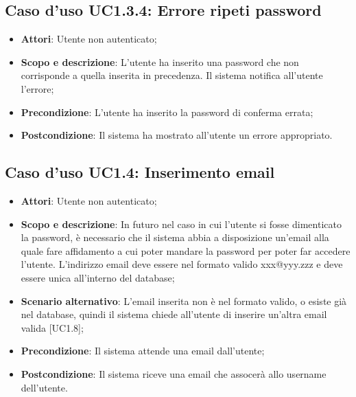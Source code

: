 \documentclass[12pt,a4paper,titlepage]{article}
\begin{document}
	\subsection{Caso d'uso UC1.3.4: Errore ripeti password}
	\label{UC1.3.4}
	\begin{itemize}
		\item \textbf{Attori}: Utente non autenticato;
		\item \textbf{Scopo e descrizione}: L'utente ha inserito una password che non corrisponde a quella inserita in precedenza. Il sistema notifica all'utente l'errore;
		\item \textbf{Precondizione}: L'utente ha inserito la password di conferma errata;
		\item \textbf{Postcondizione}: Il sistema ha mostrato all'utente un errore appropriato.
	\end{itemize}
	\subsection{Caso d'uso UC1.4: Inserimento email}
	\label{UC1.4}
	\begin{itemize}
		\item \textbf{Attori}: Utente non autenticato;
		\item \textbf{Scopo e descrizione}: In futuro nel caso in cui l'utente si fosse dimenticato la password, è necessario che il sistema abbia a disposizione un'email alla quale fare affidamento a cui poter mandare la password per poter far accedere l'utente. L'indirizzo email deve essere nel formato valido xxx@yyy.zzz e deve essere unica all'interno del database;
		\item \textbf{Scenario alternativo}: L'email inserita non è nel formato valido, o esiste già nel database, quindi il sistema chiede all'utente di inserire un'altra email valida [UC1.8];
		\item \textbf{Precondizione}: Il sistema attende una email dall'utente;
		\item \textbf{Postcondizione}: Il sistema riceve una email che assocerà allo username dell'utente.
	\end{itemize}
\end{document}
